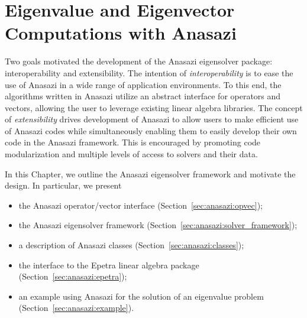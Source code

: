 % 
% 
% 
%   
%   
% 
% 

\chapter{Eigenvalue and Eigenvector Computations with Anasazi}
\label{chap:anasazi}


\begin{introchapter}
Two goals motivated the development of the Anasazi eigensolver package: interoperability
and extensibility. The intention of \emph{interoperability} is to ease the use of Anasazi
in a wide range of application environments. To this end, the algorithms written in Anasazi utilize an
abstract interface for operators and vectors, allowing the user to leverage existing
linear algebra libraries. The concept of \emph{extensibility} drives 
development of Anasazi to allow users to make efficient use of Anasazi codes while
simultaneously enabling them to easily develop their own code in the Anasazi framework.
This is encouraged by promoting code modularization and multiple levels of access to
solvers and their data.

In this Chapter, we outline the Anasazi eigensolver framework and motivate the design.
In particular, we present
\begin{itemize}
  \item the Anasazi operator/vector interface (Section~\ref{sec:anasazi:opvec});
  \item the Anasazi eigensolver framework (Section~\ref{sec:anasazi:solver_framework});
  \item a description of Anasazi classes (Section~\ref{sec:anasazi:classes});
  \item the interface to the Epetra linear algebra package (Section~\ref{sec:anasazi:epetra});
  \item an example using Anasazi for the solution of an eigenvalue problem (Section~\ref{sec:anasazi:example}).
\end{itemize}
\end{introchapter}

